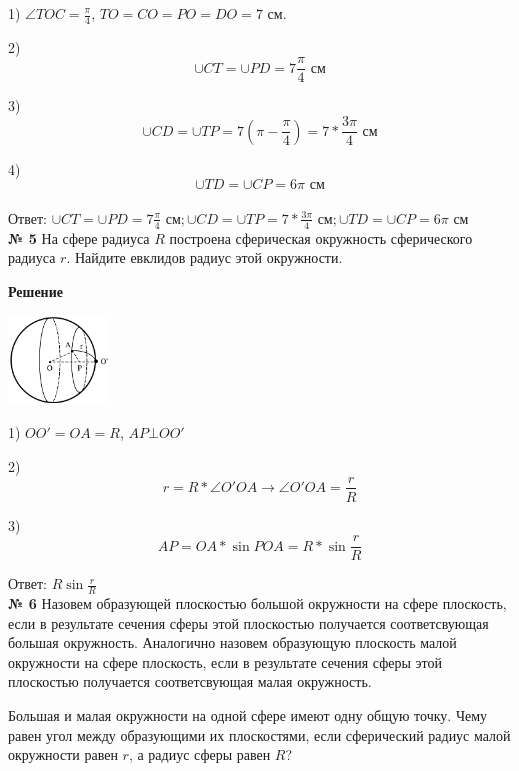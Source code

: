     1) $\angle TOC = \frac{\pi}{4}$, $TO = CO = PO = DO = 7$ см.

    2)
    \[
        \cup CT = \cup PD = 7\frac{\pi}{4} \text{ см}
    \]

    3) \[
           \cup CD = \cup TP = 7\left(\pi - \frac{\pi}{4}\right) = 7*\frac{3\pi}{4}\text{ см}
    \]

    4) \[
           \cup TD = \cup CP = 6\pi \text{ см}
    \]\\

    Ответ: $\cup CT = \cup PD = 7\frac{\pi}{4} \text{ см}; \cup CD = \cup TP = 7*\frac{3\pi}{4}\text{ см}; \cup TD = \cup CP = 6\pi \text{ см}$\\


    \textbf{№ 5}
    На сфере радиуса $R$ построена сферическая окружность сферического радиуса $r$.
    Найдите евклидов радиус этой окружности.

    \textbf{Решение}\\

    \begin{center}
        \includegraphics[width=0.2\textwidth]{images/img9}\\
    \end{center}

    1) $OO' = OA = R$, $AP \bot OO'$

    2)
    \[
        r = R*\angle O'OA \rightarrow \angle O'OA = \frac{r}{R}
    \]

    3)
    \[
        AP = OA * \sin POA = R * \sin \frac{r}{R}
    \]

    Ответ: $R\sin \frac{r}{R}$\\


    \textbf{№ 6}
    Назовем образующей плоскостью большой окружности на сфере плоскость,
    если в результате сечения сферы этой плоскостью получается соответсвующая большая окружность.
    Аналогично назовем образующую плоскость малой окружности на сфере плоскость,
    если в результате сечения сферы этой плоскостью получается соответсвующая малая окружность.

    Большая и малая окружности на одной сфере имеют одну общую точку.
    Чему равен угол между образующими их плоскостями, если сферический радиус малой окружности равен $r$,
    а радиус сферы равен $R$?\\

